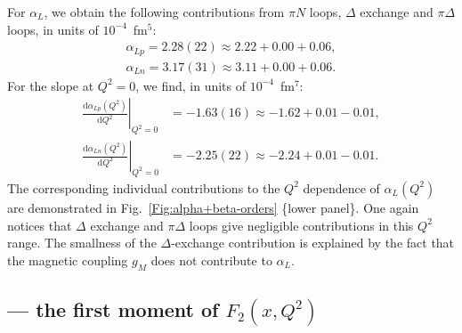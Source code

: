 \documentclass[12pt,preprint,tightenlines,
showpacs,preprintnumbers,amsmath,amssymb,
a4paper,nofootinbib]{revtex4-2}
\def\al{\alpha}
\def\dd{\mathrm{d}}
\begin{document}
For $\alpha_L$,
we obtain the following contributions from $\pi N$ loops,  $\Delta$ exchange and $\pi\Delta$ loops, in units of $10^{-4}$~fm$^5$:
\begin{subequations}
\begin{align}
\alpha_{Lp}=2.28(22)\approx 2.22+ 0.00+  0.06, \\
\alpha_{Ln}= 3.17(31)\approx 3.11 + 0.00+ 0.06.
\end{align}
\end{subequations}
For the slope at $Q^2=0$, we find, in units of $10^{-4}$~fm$^7$:
\begin{subequations}
\begin{align}
\left.\frac{\dd\alpha_{Lp} (Q^2)}{\dd Q^2}\right|_{Q^2=0}&=-1.63(16)\approx  -1.62 + 0.01 - 0.01  ,  \\
\left.\frac{\dd\alpha_{Ln} (Q^2)}{\dd Q^2}\right|_{Q^2=0}&= -2.25(22)\approx -2.24 + 0.01 - 0.01.
\end{align}
\end{subequations}
 The corresponding individual contributions to the $Q^2$ dependence
of $\alpha_L(Q^2)$ are demonstrated in Fig.~\ref{Fig:alpha+beta-orders} \{lower panel\}. One again notices
that  $\Delta$ exchange and  $\pi \Delta$ loops give negligible contributions in this $Q^2$ range. 
The smallness of the $\Delta$-exchange contribution is explained by the fact that the magnetic coupling $g_M$ does not contribute to $\al_L$.

\subsection{ --- the first moment of $F_2(x,Q^2)$}
\end{document}

